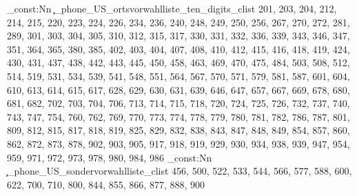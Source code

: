 \clist_const:Nn \c_phone_US_ortsvorwahlliste_ten_digits_clist {201,
203,
204,
212,
214,
215,
220,
223,
224,
226,
234,
236,
240,
248,
249,
250,
256,
267,
270,
272,
281,
289,
301,
303,
304,
305,
310,
312,
315,
317,
330,
331,
332,
336,
339,
343,
346,
347,
351,
364,
365,
380,
385,
402,
403,
404,
407,
408,
410,
412,
415,
416,
418,
419,
424,
430,
431,
437,
438,
442,
443,
445,
450,
458,
463,
469,
470,
475,
484,
503,
508,
512,
514,
519,
531,
534,
539,
541,
548,
551,
564,
567,
570,
571,
579,
581,
587,
601,
604,
610,
613,
614,
615,
617,
628,
629,
630,
631,
639,
646,
647,
657,
667,
669,
678,
680,
681,
682,
702,
703,
704,
706,
713,
714,
715,
718,
720,
724,
725,
726,
732,
737,
740,
743,
747,
754,
760,
762,
769,
770,
773,
774,
778,
779,
780,
781,
782,
786,
787,
801,
809,
812,
815,
817,
818,
819,
825,
829,
832,
838,
843,
847,
848,
849,
854,
857,
860,
862,
872,
873,
878,
902,
903,
905,
917,
918,
919,
929,
930,
934,
938,
939,
947,
954,
959,
971,
972,
973,
978,
980,
984,
986}
\clist_const:Nn \c_phone_US_sondervorwahlliste_clist {456,
500,
522,
533,
544,
566,
577,
588,
600,
622,
700,
710,
800,
844,
855,
866,
877,
888,
900}
